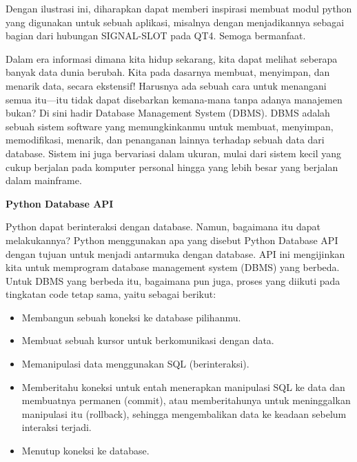 \vspace{12pt}
Dengan ilustrasi ini, diharapkan dapat memberi inspirasi membuat modul python yang digunakan untuk sebuah aplikasi, misalnya dengan menjadikannya sebagai bagian dari hubungan SIGNAL-SLOT pada QT4. Semoga bermanfaat. \par
\vspace{12pt}
Dalam era informasi dimana kita hidup sekarang, kita dapat melihat seberapa banyak data dunia berubah. Kita pada dasarnya membuat, menyimpan, dan menarik data, secara ekstensif! Harusnya ada sebuah cara untuk menangani semua itu—itu tidak dapat disebarkan kemana-mana tanpa adanya manajemen bukan? Di sini hadir Database Management System (DBMS). DBMS adalah sebuah sistem software yang memungkinkanmu untuk membuat, menyimpan, memodifikasi, menarik, dan penanganan lainnya terhadap sebuah data dari database. Sistem ini juga bervariasi dalam ukuran, mulai dari sistem kecil yang cukup berjalan pada komputer personal hingga yang lebih besar yang berjalan dalam mainframe. \par
\vspace{12pt}
\noindent 
\textbf{Python Database API} \par
Python dapat berinteraksi dengan database. Namun, bagaimana itu dapat melakukannya? Python menggunakan apa yang disebut Python Database API dengan tujuan untuk menjadi antarmuka dengan database. API ini mengijinkan kita untuk memprogram database management system (DBMS) yang berbeda. Untuk DBMS yang berbeda itu, bagaimana pun juga, proses yang diikuti pada tingkatan code tetap sama, yaitu sebagai berikut: \par
\vspace{12pt}
\noindent 
\begin{itemize}
\item Membangun sebuah koneksi ke database pilihanmu. \par
\noindent 
\item Membuat sebuah kursor untuk berkomunikasi dengan data. \par
\noindent 
\item Memanipulasi data menggunakan SQL (berinteraksi). \par
\noindent 
\item Memberitahu koneksi untuk entah menerapkan manipulasi SQL ke data dan membuatnya permanen (commit), atau memberitahunya untuk meninggalkan manipulasi itu (rollback), sehingga mengembalikan data ke keadaan sebelum interaksi terjadi. \par
\noindent 
\item Menutup koneksi ke database.\end{itemize}
